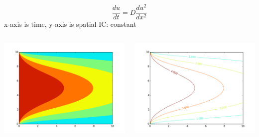 \documentclass{beamer}
\begin{document}
\begin{frame}
    $$
    \frac{du}{dt} = D\frac{du^{2}}{dx^{2}}
    $$
    \newline
    x-axis is time, y-axis is spatial
    \newline
    IC: constant
    \newline
  \begin{columns}[T]
    \begin{column}{.5\textwidth}
   
    \includegraphics[scale=0.25]{hm1.pdf}
    
    \end{column}
    
    \begin{column}{.5\textwidth}
   
    \includegraphics[scale=0.25]{cm1.pdf}
  
    \end{column}
  \end{columns}
\end{frame}
\end{document}
